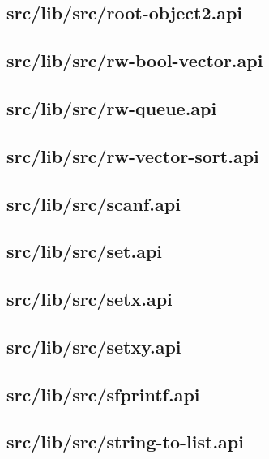 \subsection{src/lib/src/root-object2.api}


\subsection{src/lib/src/rw-bool-vector.api}


\subsection{src/lib/src/rw-queue.api}


\subsection{src/lib/src/rw-vector-sort.api}


\subsection{src/lib/src/scanf.api}


\subsection{src/lib/src/set.api}


\subsection{src/lib/src/setx.api}


\subsection{src/lib/src/setxy.api}


\subsection{src/lib/src/sfprintf.api}


\subsection{src/lib/src/string-to-list.api}



